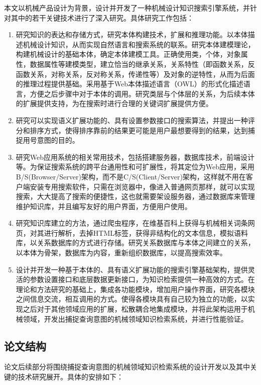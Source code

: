 \documentclass[12pt,a4paper]{article}
\begin{document}
	本文以机械产品设计为背景，设计并开发了一种机械设计知识搜索引擎系统，并针对其中的若干关键技术进行了深入研究。具体研究工作包括：
	\begin{enumerate}
		\item
	
	研究知识的表达和存储方式，研究本体构建技术，扩展和推理功能。以本体描述机械设计知识，从而实现自然语言和搜索系统的联系。研究本体建模理论，构建机械设计的基础本体，确定本体建模工具。正确使用类，个体，对象属性，数据属性等建模类型，建立恰当的继承关系，关系特性（即函数关系，反函数关系，对称关系，反对称关系，传递性等）及对象的逆特性，从而为后面的推理过程提供基础。采用基于Web本体描述语言（OWL）的形式化描述语言，方便之后步骤中对于本体的调用。研究类层与个体层的关系，为后续本体的扩展提供支持，为在搜索时进行合理的关键词扩展提供方便。
		\item
	研究可以实现语义扩展功能的、具有设置参数接口的搜索算法，并提出一种评分和排序方式，使得排序靠前的结果更可能是用户最想要得到的结果，达到捕捉用号意图的目的。
		\item
	研究Web应用系统的相关常用技术，包括搭建服务器，数据库技术，前端设计等。为保证搜索系统的跨平台通用性和可扩展性，将其定位为Web应用，采用B/S(Browser/Server)架构，而不是C/S(Client/Server)架构，这样就不用在客户端安装专用搜索软件，只需在浏览器中，像进入普通网页那样，就可以实现搜索，大大提高了搜索的便捷性，这也就需要架设服务器，通过数据库来管理维护知识库，并且编写友好的用户界面，方便用户使用。
		\item
	研究知识库建立的方法，通过爬虫程序，在维基百科上获得与机械相关词条网页，对其进行解析，去掉HTML标签，获得非结构化的文本信息，模拟语料库，以关系数据库的方式进行存储。研究关系数据库与本体之间建立的关系，以本体为骨架，数据库为内容，重新组织数据库，以提高搜索效率。
		\item
	设计并开发一种基于本体的、具有语义扩展功能的搜索引擎基础架构，提供灵活的参数设置接口和底层数据更新接口，为知识检索提供一种高效的方式。在理论和方法研究的基础上，集成各功能模块，增加用户操作界面，研究各模块之间信息交流，相互调用的方式。使得各模块具有自己较为独立的功能，以实现之后对于其他领域应用的扩展，松散耦合地集成模块，并将此架构运用于机械领域，开发出捕捉查询意图的机械领域知识检索系统，并进行性能验证。
	\end{enumerate}

	\subsection{论文结构}
	论文后续部分将围绕捕捉查询意图的机械领域知识检索系统的设计开发以及其中关键的技术研究展开。具体的安排如下：
\end{document}
